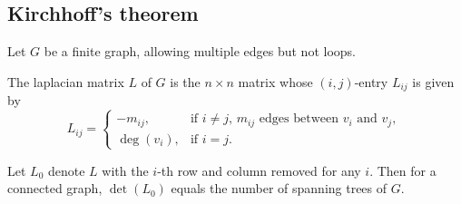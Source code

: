 \subsection{Kirchhoff's theorem}

Let $G$ be a finite graph, allowing multiple edges but not loops.

The laplacian matrix $L$ of $G$ is the $n \times n$ matrix whose
$(i, j)$-entry $L_{i j}$ is given by
\begin{displaymath}
L_{i j} = \left\{ \begin{array}{ll}
-m_{i j}, & \textrm{if $i \ne j$, $m_{i j}$ edges between $v_i$ and $v_j$, } \\
\deg(v_i), & \textrm{if $i = j$.}
\end{array} \right.
\end{displaymath}

Let $L_0$ denote $L$ with the $i$-th row and column removed for any $i$.
Then for a connected graph, $\det(L_0)$ equals the number of spanning trees of $G$.